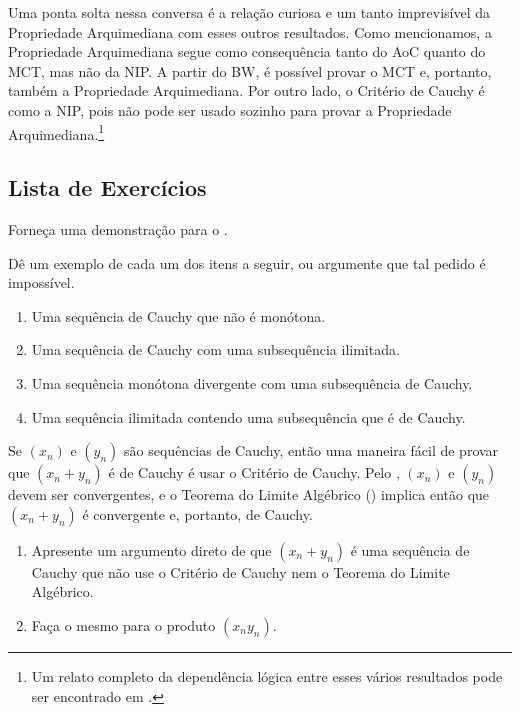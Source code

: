 Uma ponta solta nessa conversa é a relação curiosa e um tanto imprevisível da Propriedade Arquimediana com esses outros resultados. Como mencionamos, a Propriedade Arquimediana segue como consequência tanto do AoC quanto do MCT, mas não da NIP. A partir do BW, é possível provar o MCT e, portanto, também a Propriedade Arquimediana. Por outro lado, o Critério de Cauchy é como a NIP, pois não pode ser usado sozinho para provar a Propriedade Arquimediana.\footnote{Um relato completo da dependência lógica entre esses vários resultados pode ser encontrado em \cite{MR3035440}.} 


\subsection{Lista de Exercícios}\label{subsec:exercicios-criterio-cauchy}

\begin{exercise}\label{ex:2-6-1}
Forneça uma demonstração para o .
\end{exercise}

\begin{exercise}\label{ex:2-6-2}
Dê um exemplo de cada um dos itens a seguir, ou argumente que tal pedido é impossível.
\begin{enumerate}[label=\alph*)]
\item Uma sequência de Cauchy que não é monótona.
\item Uma sequência de Cauchy com uma subsequência ilimitada.
\item Uma sequência monótona divergente com uma subsequência de Cauchy.
\item Uma sequência ilimitada contendo uma subsequência que é de Cauchy.
\end{enumerate}
\end{exercise}

\begin{exercise}\label{ex:2-6-3}
Se $(x_n)$ e $(y_n)$ são sequências de Cauchy, então uma maneira fácil de provar que $(x_n + y_n)$ é de Cauchy é usar o Critério de Cauchy. Pelo , $(x_n)$ e $(y_n)$ devem ser convergentes, e o Teorema do Limite Algébrico () implica então que $(x_n + y_n)$ é convergente e, portanto, de Cauchy.
\begin{enumerate}[label=\alph*)]
\item Apresente um argumento direto de que $(x_n + y_n)$ é uma sequência de Cauchy que não use o Critério de Cauchy nem o Teorema do Limite Algébrico.
\item Faça o mesmo para o produto $(x_n y_n)$.
\end{enumerate}
\end{exercise}

